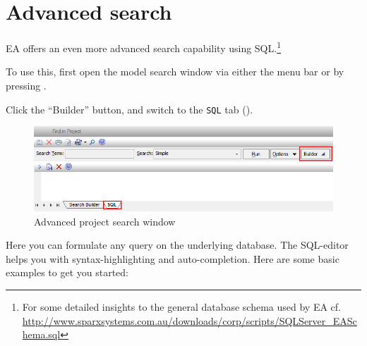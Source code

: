 \section{Advanced search}
\label{sect:appendix_adv_search}

EA offers an even more advanced search capability using SQL.\footnote{For some detailed insights to the general database schema used by EA cf. \\
\url{http://www.sparxsystems.com.au/downloads/corp/scripts/SQLServer_EASchema.sql}}

\begin{stepbystep}

\item To use this, first open the model search window via either the menu bar or by pressing .

\item Click the ``Builder'' button, and switch to the \texttt{SQL} tab (). 

\begin{figure}[htbp]
\begin{center}
  \includegraphics[width=\textwidth]{../../org.moflon.doc.handbook.05_miscellaneous/1_grokkingEA/08_advSearch/ea_activateSQLSearch}
  \caption{Advanced project search window}  
  \label{ea:builderSQLtab}
\end{center}
\end{figure}

\end{stepbystep}

Here you can formulate any query on the underlying database. The SQL-editor helps you with syntax-highlighting and auto-completion. Here are some basic
examples to get you started:

